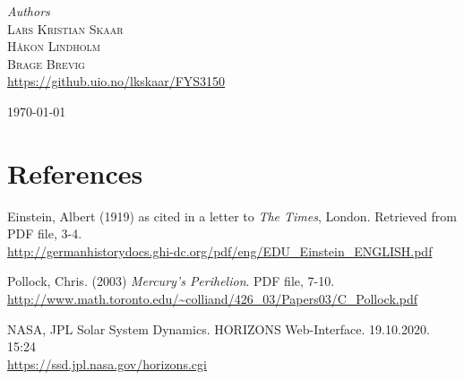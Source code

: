 \begin{titlepage}
		{\large\textit{Authors}}\\
		\textsc{Lars Kristian Skaar}\\
		\textsc{Håkon Lindholm}\\
		\textsc{Brage Brevig} %
		\\
		\url{https://github.uio.no/lkskaar/FYS3150}
		
		\vfill\vfill\vfill %
		
		{\large\today} %
		
		
		\vfill\vfill
		
		
		
	\end{titlepage}

	\newpage
	\setlength\parindent{0pt}
	
	
	\newpage
	\tableofcontents
	
	
	
	 
	
	
	
	
	
	\section{References}
	\begin{thebibliography}{5}
		Einstein, Albert (1919) as cited in a letter to \textit{The Times}, London. Retrieved from PDF file, 3-4.\\
		\url{http://germanhistorydocs.ghi-dc.org/pdf/eng/EDU_Einstein_ENGLISH.pdf}
		
		Pollock, Chris. (2003) \textit{Mercury's Perihelion}. PDF file, 7-10.\\ \url{http://www.math.toronto.edu/~colliand/426_03/Papers03/C_Pollock.pdf}
		
		NASA, JPL Solar System Dynamics. HORIZONS Web-Interface. 19.10.2020. 15:24 \\
		\url{https://ssd.jpl.nasa.gov/horizons.cgi}
		
	\end{thebibliography}
	
